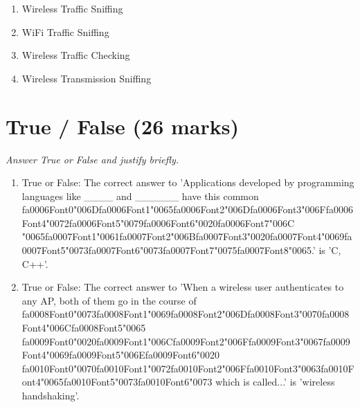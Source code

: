 \documentclass[12pt]{article}
\begin{document}
\begin{enumerate}[label=\arabic*.]
\begin{enumerate}[label=(\alph*)]
    \item Wireless Traffic Sniffing
    \item WiFi Traffic Sniffing
    \item Wireless Traffic Checking
    \item Wireless Transmission Sniffing
\end{enumerate}
\end{enumerate}

\section*{True / False (26 marks)}
\textit{Answer True or False and justify briefly.}
\begin{enumerate}[label=\arabic*.]
\item True or False: The correct answer to 'Applications developed by programming languages like \_\_\_\_ and \_\_\_\_\_\_ have this common {\csname fa0006Font0\endcsname\char"006D}{\csname fa0006Font1\endcsname\char"0065}{\csname fa0006Font2\endcsname\char"006D}{\csname fa0006Font3\endcsname\char"006F}{\csname fa0006Font4\endcsname\char"0072}{\csname fa0006Font5\endcsname\char"0079}{\csname fa0006Font6\endcsname\char"0020}{\csname fa0006Font7\endcsname\char"006C} {\char"0065}{\csname fa0007Font1\endcsname\char"0061}{\csname fa0007Font2\endcsname\char"006B}{\csname fa0007Font3\endcsname\char"0020}{\csname fa0007Font4\endcsname\char"0069}{\csname fa0007Font5\endcsname\char"0073}{\csname fa0007Font6\endcsname\char"0073}{\csname fa0007Font7\endcsname\char"0075}{\csname fa0007Font8\endcsname\char"0065}.' is 'C, C++'.
\item True or False: The correct answer to 'When a wireless user authenticates to any AP, both of them go in the course of {\csname fa0008Font0\endcsname\char"0073}{\csname fa0008Font1\endcsname\char"0069}{\csname fa0008Font2\endcsname\char"006D}{\csname fa0008Font3\endcsname\char"0070}{\csname fa0008Font4\endcsname\char"006C}{\csname fa0008Font5\endcsname\char"0065} {\csname fa0009Font0\endcsname\char"0020}{\csname fa0009Font1\endcsname\char"006C}{\csname fa0009Font2\endcsname\char"006F}{\csname fa0009Font3\endcsname\char"0067}{\csname fa0009Font4\endcsname\char"0069}{\csname fa0009Font5\endcsname\char"006E}{\csname fa0009Font6\endcsname\char"0020} {\csname fa0010Font0\endcsname\char"0070}{\csname fa0010Font1\endcsname\char"0072}{\csname fa0010Font2\endcsname\char"006F}{\csname fa0010Font3\endcsname\char"0063}{\csname fa0010Font4\endcsname\char"0065}{\csname fa0010Font5\endcsname\char"0073}{\csname fa0010Font6\endcsname\char"0073} which is called...' is 'wireless handshaking'.

\end{enumerate}
\end{document}
